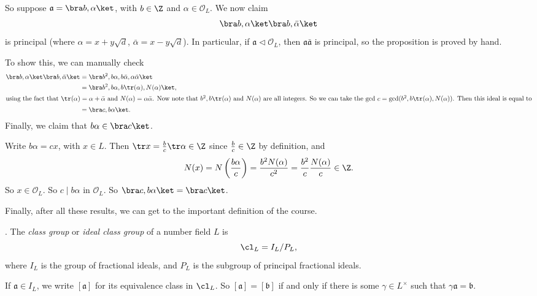 \documentclass[a4paper]{article}
\begin{document}
\begin{eg}
  So suppose $\mathfrak{a} = \bra b, \alpha\ket$, with $b \in \Z$ and $\alpha \in \mathcal{O}_L$. We now claim
  \[
    \bra b, \alpha\ket \bra b, \bar{\alpha}\ket
  \]
  is principal (where $\alpha = x + y \sqrt{d}$, $\bar{\alpha} = x - y \sqrt{d}$). In particular, if $\mathfrak{a} \lhd \mathcal{O}_L$, then $\mathfrak{a} \bar{\mathfrak{a}}$ is principal, so the proposition is proved by hand.

  To show this, we can manually check
  \begin{align*}
    \bra b, \alpha\ket \bra b, \bar{\alpha}\ket &= \bra b^2, b\alpha, b\bar{\alpha}, \alpha\bar{\alpha}\ket\\
    &= \bra b^2, b\alpha, b\tr(\alpha), N(\alpha)\ket,\\
    \intertext{using the fact that $\tr(\alpha) = \alpha + \bar{\alpha}$ and $N(\alpha) = \alpha \bar{\alpha}$. Now note that $b^2, b\tr(\alpha)$ and $N(\alpha)$ are all integers. So we can take the gcd $c = \gcd(b^2, b\tr(\alpha), N(\alpha))$. Then this ideal is equal to}
    &= \bra c, b\alpha\ket.
  \end{align*}
  Finally, we claim that $b\alpha \in \bra c\ket$.

  Write $b\alpha = cx$, with $x \in L$. Then $\tr x = \frac{b}{c} \tr \alpha \in \Z$ since $\frac{b}{c} \in \Z$ by definition, and
  \[
    N(x) = N\left(\frac{b\alpha}{c}\right) = \frac{b^2 N(\alpha)}{c^2} = \frac{b^2}{c} \frac{N(\alpha)}{c} \in \Z.
  \]
  So $x \in \mathcal{O}_L$. So $c \mid b\alpha$ in $\mathcal{O}_L$. So $\bra c, b\alpha\ket = \bra c\ket$.
\end{eg}

Finally, after all these results, we can get to the important definition of the course.

\begin{defi}.
  The \emph{class group} or \emph{ideal class group} of a number field $L$ is
  \[
    \cl_L = I_L/P_L,
  \]
  where $I_L$ is the group of fractional ideals, and $P_L$ is the subgroup of principal fractional ideals.
\end{defi}
If $\mathfrak{a} \in I_L$, we write $[\mathfrak{a}]$ for its equivalence class in $\cl_L$. So $[\mathfrak{a}] = [\mathfrak{b}]$ if and only if there is some $\gamma\in L^\times$ such that $\gamma \mathfrak{a} = \mathfrak{b}$.
\end{document}
